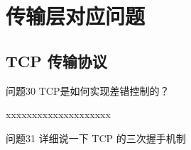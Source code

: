 \documentclass[cn,11pt,color=blue,lang=cn]{elegantbook}
\begin{document}
\chapter{传输层对应问题}
\section{TCP 传输协议}

\begin{custom}{问题30}
TCP是如何实现差错控制的？
\end{custom}
\begin{solution}
xxxxxxxxxxxxxxxxxxxx
\end{solution}

\begin{custom}{问题31}
详细说一下 TCP 的三次握手机制
\end{custom}
\end{document}
